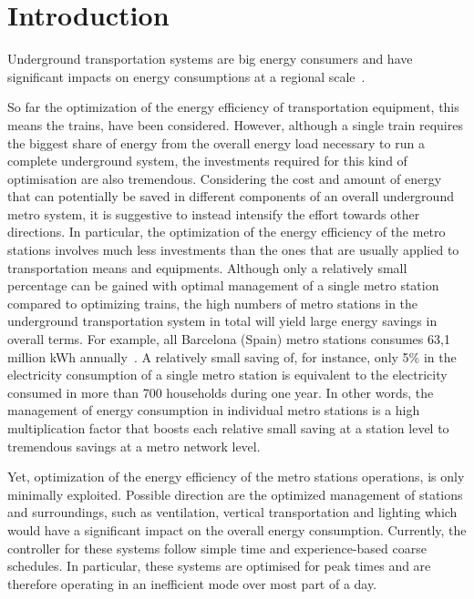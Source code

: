 \section{Introduction}
\label{sec:introduction}
Underground transportation systems are big energy consumers and have significant impacts on energy consumptions at a regional scale~\cite{anderson_maximizing_2009}. 

So far the optimization of the energy efficiency of transportation equipment, this means the trains, have been considered. 
However, although a single train requires the biggest share of energy from the overall energy load necessary to run a complete underground system, the investments required for this kind of optimisation are also tremendous. 
Considering the cost and amount of energy that can potentially be saved in different components of an overall underground metro system, it is suggestive to instead intensify the effort towards other directions.   
In particular, the optimization of the energy efficiency of the metro stations involves much less investments than the ones that are usually applied to transportation means and equipments. 
Although only a relatively small percentage can be gained with optimal management of a single metro station compared to optimizing trains, the high numbers of metro stations in the underground transportation system in total will yield large energy savings in overall terms. 
For example, all Barcelona (Spain) metro stations consumes 63,1 million kWh annually~\cite{TMB}. 
A relatively small saving of, for instance, only 5\% in the electricity consumption of a single metro station is equivalent to the electricity consumed in more than 700 households during one year.
In other words, the management of energy consumption in individual metro stations is a high multiplication factor that boosts each relative small saving at a station level to tremendous savings at a metro network level.

Yet, optimization of the energy efficiency of the metro stations operations, is only minimally exploited.
Possible direction are the optimized management of stations and surroundings, such as ventilation, vertical transportation and lighting which would have a significant impact on the overall energy consumption.
Currently, the controller for these systems follow simple time and experience-based coarse schedules. 
In particular, these systems are optimised for peak times and are therefore operating in an inefficient mode over most part of a day.

